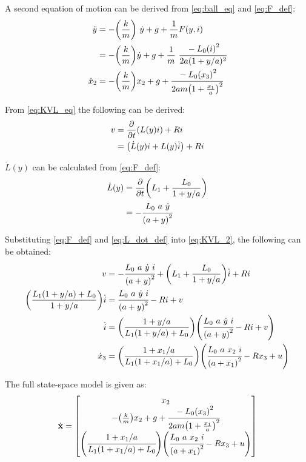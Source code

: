 \documentclass[letter]{article}
\begin{document}
A second equation of motion can be derived from \eqref{eq:ball_eq} and \eqref{eq:F_def}:
\begin{align}
	\ddot{y}	&= -\qty(\frac{k}{m}) \ \dot{y} + g + \frac{1}{m} F(y,i)\nonumber \\
				&= -\qty(\frac{k}{m}) \dot{y} + g + \frac{1}{m} \ \cfrac{- L_0 \qty(i)^2}{2 a (1+y/a)^2} \nonumber \\
	\dot{x}_2	&= -\qty(\frac{k}{m}) x_2 + g + \cfrac{- L_0 \qty(x_3)^2}{2 a m \qty(1 + \frac{x_1}{a})^2}
\end{align}

From \eqref{eq:KVL_eq} the following can be derived:
\begin{align}
	v 	&= \pdv{t} \qty(L(y) i) + R i\nonumber\\
		&= \qty(\dot{L}(y) i + L(y) \dot{i}) + R i \label{eq:KVL_2}
\end{align}

$\dot{L}(y)$ can be calculated from \eqref{eq:F_def}:
\begin{align}
	\dot{L}(y) 	&= \pdv{t}\qty(L_1 + \frac{L_0}{1 + y/a})\nonumber \\
				&= - \cfrac{L_0 \ a \ \dot{y}}{\qty(a + y)^2} \label{eq:L_dot_def}
\end{align}

Substituting \eqref{eq:F_def} and \eqref{eq:L_dot_def} into \eqref{eq:KVL_2}, the following can be obtained:
\begin{align}
	v	&= - \cfrac{L_0 \ a \ \dot{y} \ i}{\qty(a + y)^2}  + \qty(L_1 + \frac{L_0}{1 + y/a}) \dot{i} + R i \nonumber\\
	\qty(\frac{L_1 \qty(1 + y/a) + L_0}{1 + y/a}) \dot{i} &= \cfrac{L_0 \ a \ \dot{y} \ i}{\qty(a + y)^2} - R i  + v \nonumber \\
	\dot{i} &= \qty(\frac{1 + y/a}{L_1 \qty(1 + y/a) + L_0}) \qty(\cfrac{L_0 \ a \ \dot{y} \ i}{\qty(a + y)^2} - R i + v) \nonumber\\
	\dot{x}_3 &= \qty(\frac{1 + {x_1}/a}{L_1 \qty(1 + {x_1}/a) + L_0}) \qty(\cfrac{L_0 \ a \ {x_2} \ i}{\qty(a + {x_1})^2} - R {x_3} + u) \label{eq:x3_dot_def}
\end{align}


The full state-space model is given as:
\begin{equation}\label{eq:state_space_def}
	\dot{\vb{x}} = \mqty[x_2\\
						-\qty(\frac{k}{m}) x_2 + g + \cfrac{- L_0 \qty(x_3)^2}{2 a m \qty(1 + \frac{x_1}{a})^2}\\
						\qty(\cfrac{1 + {x_1}/a}{L_1 \qty(1 + {x_1}/a) + L_0}) \qty(\cfrac{L_0 \ a \ {x_2} \ i}{\qty(a + {x_1})^2} - R {x_3} + u)]
\end{equation}\\
\end{document}

